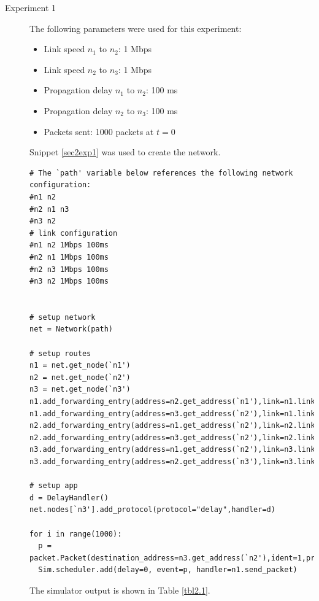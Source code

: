 \documentclass[11pt]{article}
\begin{document}
\begin{description}
\item[Experiment 1] \hfill \break
The following parameters were used for this experiment:

\begin{itemize}
\item Link speed $n_1$ to $n_2$: 1 Mbps
\item Link speed $n_2$ to $n_3$: 1 Mbps
\item Propagation delay $n_1$ to $n_2$: 100 ms
\item Propagation delay $n_2$ to $n_3$: 100 ms
\item Packets sent: 1000 packets at $t = 0$
\end{itemize}

\medskip

Snippet \ref{sec2exp1} was used to create the network.

\medskip

\begin{lstlisting}[caption={Network 2.1},label=sec2exp1]
# The `path' variable below references the following network configuration:
#n1 n2
#n2 n1 n3
#n3 n2
# link configuration
#n1 n2 1Mbps 100ms
#n2 n1 1Mbps 100ms
#n2 n3 1Mbps 100ms
#n3 n2 1Mbps 100ms


# setup network
net = Network(path)

# setup routes
n1 = net.get_node(`n1')
n2 = net.get_node(`n2')
n3 = net.get_node(`n3')
n1.add_forwarding_entry(address=n2.get_address(`n1'),link=n1.links[0])
n1.add_forwarding_entry(address=n3.get_address(`n2'),link=n1.links[0])
n2.add_forwarding_entry(address=n1.get_address(`n2'),link=n2.links[0])
n2.add_forwarding_entry(address=n3.get_address(`n2'),link=n2.links[1])
n3.add_forwarding_entry(address=n1.get_address(`n2'),link=n3.links[0])
n3.add_forwarding_entry(address=n2.get_address(`n3'),link=n3.links[0])

# setup app
d = DelayHandler()
net.nodes[`n3'].add_protocol(protocol="delay",handler=d)

for i in range(1000):
  p = packet.Packet(destination_address=n3.get_address(`n2'),ident=1,protocol=`delay',length=1000)
  Sim.scheduler.add(delay=0, event=p, handler=n1.send_packet)
\end{lstlisting}

The simulator output is shown in Table \ref{tbl2.1}.

\smallskip


\end{description}
\end{document}

